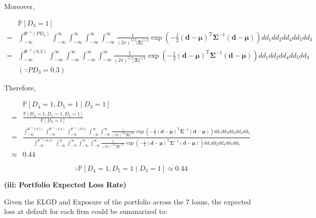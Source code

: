 \documentclass[11pt]{article}
\renewcommand\part[1]{\vspace{.10in}\textbf{(#1)}}
\renewcommand{\P}{\mathbb{P}}
\begin{document}
Moreover,

$$
\begin{aligned}
& \P[D_3 = 1] \\
=& \int_{-\infty}^{\Phi^{-1}(PD_3)}
\int_{-\infty}^{\infty}
\int_{-\infty}^{\infty}
\int_{-\infty}^{\infty}
\int_{-\infty}^{\infty}
\frac{1}{(2\pi)^{5/2}|\mathbf{\Sigma}|^{1/2}}\exp\left(-\frac{1}{2}(\mathbf{d}-\mathbf{\mu})^{\mathrm{T}}\mathbf{\Sigma}^{-1}(\mathbf{d}-\mathbf{\mu})\right)
d d_1 d d_2 d d_4 d d_5 d d_3 \\
=& \int_{-\infty}^{\Phi^{-1}(0.3)}
\int_{-\infty}^{\infty}
\int_{-\infty}^{\infty}
\int_{-\infty}^{\infty}
\int_{-\infty}^{\infty}
\frac{1}{(2\pi)^{5/2}|\mathbf{\Sigma}|^{1/2}}\exp\left(-\frac{1}{2}(\mathbf{d}-\mathbf{\mu})^{\mathrm{T}}\mathbf{\Sigma}^{-1}(\mathbf{d}-\mathbf{\mu})\right)
d d_1 d d_2 d d_4 d d_5 d d_3 \\
&(\because PD_3 = 0.3)
\end{aligned}
$$

Therefore,

$$
\begin{aligned}
&\P[D_4 = 1, D_5 = 1 \mid D_3 = 1] \\
=& \frac{\P[D_4 = 1, D_5 = 1, D_3 = 1]}{\P[D_3 = 1]} \\
=& \frac{
\int_{-\infty}^{\Phi^{-1}(0.5)}
\int_{-\infty}^{\Phi^{-1}(0.4)}
\int_{-\infty}^{\Phi^{-1}(0.3)}
\int_{-\infty}^{\infty}
\int_{-\infty}^{\infty}
\frac{1}{(2\pi)^{5/2}|\mathbf{\Sigma}|^{1/2}}\exp\left(-\frac{1}{2}(\mathbf{d}-\mathbf{\mu})^{\mathrm{T}}\mathbf{\Sigma}^{-1}(\mathbf{d}-\mathbf{\mu})\right)
d d_1 d d_2 d d_3 d d_4 d d_5
}
{
\int_{-\infty}^{\Phi^{-1}(0.3)}
\int_{-\infty}^{\infty}
\int_{-\infty}^{\infty}
\int_{-\infty}^{\infty}
\int_{-\infty}^{\infty}
\frac{1}{(2\pi)^{5/2}|\mathbf{\Sigma}|^{1/2}}\exp\left(-\frac{1}{2}(\mathbf{d}-\mathbf{\mu})^{\mathrm{T}}\mathbf{\Sigma}^{-1}(\mathbf{d}-\mathbf{\mu})\right)
d d_1 d d_2 d d_4 d d_5 d d_3
} \\
\approx & 0.44
\end{aligned}
$$

$$
\therefore
\P[D_4 = 1, D_5 = 1 \mid D_3 = 1]
\approx 0.44
$$

\part{iii: Portfolio Expected Loss Rate}

Given the ELGD and Exposure of the portfolio across the 7 loans,
the expected loss at default for each firm could be summarized to:
\end{document}
